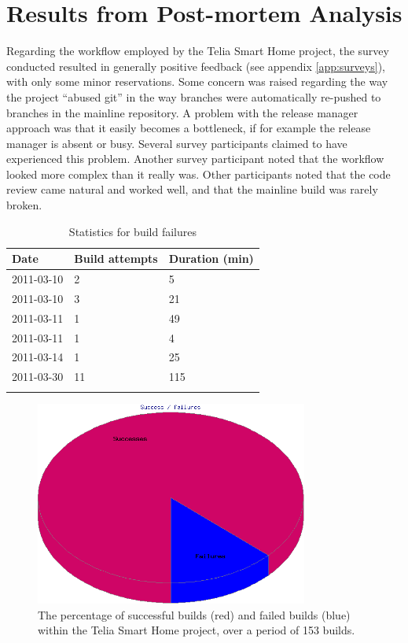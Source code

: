 \documentclass{llncs}
\begin{document}
\section{Results from Post-mortem Analysis}

Regarding the workflow employed by the Telia Smart Home project, the
survey conducted resulted in generally positive feedback (see appendix
\ref{app:surveys}), with only some minor reservations. Some concern was raised
regarding the way the project ``abused git'' in the way branches were
automatically re-pushed to branches in the mainline repository. A
problem with the release manager approach was that it easily becomes a
bottleneck, if for example the release manager is absent or
busy. Several survey participants claimed to have experienced this
problem. Another survey participant noted that the workflow looked
more complex than it really was. Other participants noted that the
code review came natural and worked well, and that the mainline build
was rarely broken.

\begin{table}[tp]
 \caption{Statistics for build failures}
 \begin{center}
  \begin{tabularx}{0.9\textwidth}{p{3.5cm}p{3.5cm}X}
   \toprule
   Date & Build attempts & Duration (min) \\
   \midrule
   2011-03-10 & 2 & 5 \\
   2011-03-10 & 3 & 21 \\
   2011-03-11 & 1 & 49 \\
   2011-03-11 & 1 & 4 \\
   2011-03-14 & 1 & 25 \\
   2011-03-30 & 11 & 115 \\
   \bottomrule
   \\[-0.7em]
  \end{tabularx}
  \label{tbl:breakage}
 \end{center}
\end{table}

\begin{figure}[tp]
 \begin{center}
  \includegraphics[width=0.8\textwidth]{binary-blobs/pie}
  \caption{The percentage of successful builds (red) and failed
           builds (blue) within the Telia Smart Home project, over a
           period of 153 builds.}
  \label{fig:successbuilds}
 \end{center}
\end{figure}
\end{document}
